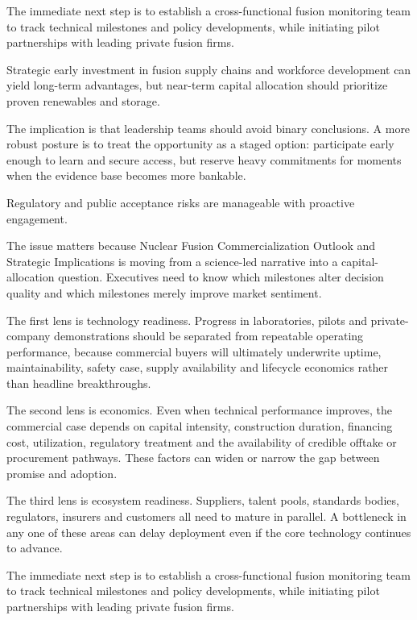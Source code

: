 \documentclass[10pt,a4paper]{article}
\begin{document}
{\small The immediate next step is to establish a cross-functional fusion monitoring team to track technical milestones and policy developments, while initiating pilot partnerships with leading private fusion firms.}\par
{\small Strategic early investment in fusion supply chains and workforce development can yield long-term advantages, but near-term capital allocation should prioritize proven renewables and storage.}\par
{\small The implication is that leadership teams should avoid binary conclusions. A more robust posture is to treat the opportunity as a staged option: participate early enough to learn and secure access, but reserve heavy commitments for moments when the evidence base becomes more bankable.}\par
{}\par\vspace{1pt}
{\small Regulatory and public acceptance risks are manageable with proactive engagement.}\par
{\small The issue matters because Nuclear Fusion Commercialization Outlook and Strategic Implications is moving from a science-led narrative into a capital-allocation question. Executives need to know which milestones alter decision quality and which milestones merely improve market sentiment.}\par
{\small The first lens is technology readiness. Progress in laboratories, pilots and private-company demonstrations should be separated from repeatable operating performance, because commercial buyers will ultimately underwrite uptime, maintainability, safety case, supply availability and lifecycle economics rather than headline breakthroughs.}\par
{\small The second lens is economics. Even when technical performance improves, the commercial case depends on capital intensity, construction duration, financing cost, utilization, regulatory treatment and the availability of credible offtake or procurement pathways. These factors can widen or narrow the gap between promise and adoption.}\par
{\small The third lens is ecosystem readiness. Suppliers, talent pools, standards bodies, regulators, insurers and customers all need to mature in parallel. A bottleneck in any one of these areas can delay deployment even if the core technology continues to advance.}\par
{}\par\vspace{1pt}
{\small The immediate next step is to establish a cross-functional fusion monitoring team to track technical milestones and policy developments, while initiating pilot partnerships with leading private fusion firms.}\par
\label{chap:2:end}
\end{document}
